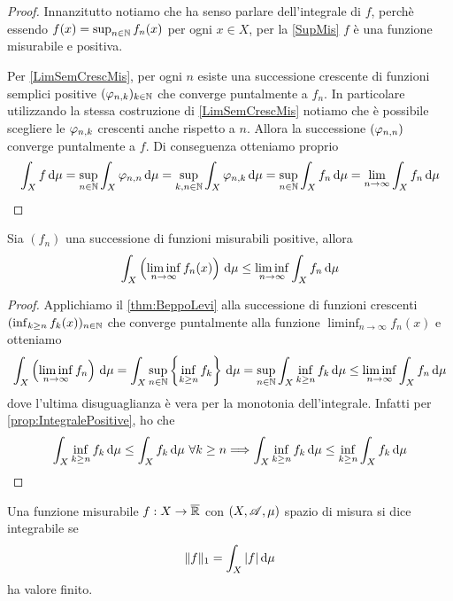 \begin{proof}
	Innanzitutto notiamo che ha senso parlare dell'integrale di $f$, perchè essendo $f(x)=\sup_{n\in\mathbb N}f_n(x)$ per ogni $x\in X$, per la \cref{SupMis} $f$ è una funzione misurabile e positiva.
	
	Per \cref{LimSemCrescMis}, per ogni $n$ esiste una successione crescente di funzioni semplici positive $(\varphi_{n,k})_{k\in\mathbb N}$ che converge puntalmente a $f_n$. In particolare utilizzando la stessa costruzione di \cref{LimSemCrescMis} notiamo che è possibile scegliere le $\varphi_{n,k}$ crescenti anche rispetto a $n$. Allora la successione $(\varphi_{n,n})$ converge puntalmente a $f$. Di conseguenza otteniamo proprio
	\begin{equation*}
		\int_X f\,\mathrm d\mu=\sup_{n\in\mathbb N}\int_X\varphi_{n,n}\,\mathrm d\mu=\sup_{k,n\in\mathbb N}\int_X \varphi_{n,k}\,\mathrm d\mu=\sup_{n\in\mathbb N}\int_X f_n\,\mathrm d\mu=\lim_{n\to\infty}\int_Xf_n\,\mathrm d\mu
	\end{equation*}
\end{proof}


\begin{lemma}[Fatou] \label{lem:Fatou}
	Sia $(f_n)$ una successione di funzioni misurabili positive, allora 
	\begin{equation*}
		\int_X\left(\liminf_{n\to\infty}f_n(x)\right)\,\mathrm d\mu\le \liminf_{n\to\infty}\int_Xf_n\,\mathrm d\mu
	\end{equation*}
\end{lemma}

\begin{proof}
	Applichiamo il \cref{thm:BeppoLevi} alla successione di funzioni crescenti $(\inf_{k\ge n}f_k(x))_{n\in\mathbb N}$ che converge puntalmente alla funzione $\liminf_{n\to\infty}f_n(x)$ e otteniamo
	\begin{equation*}
		\int_X\left(\liminf_{n\to\infty}f_n\right)\,\mathrm d\mu=\int_X \sup_{n\in\mathbb N}\left\{\inf_{k\ge n}f_k\right\}\,\mathrm d\mu=\sup_{n\in\mathbb N}\int_X \inf_{k\ge n}f_k\,\mathrm d\mu\le \liminf_{n\to\infty}\int_Xf_n\,\mathrm d\mu
	\end{equation*}
	dove l'ultima disuguaglianza è vera per la monotonia dell'integrale. Infatti per \cref{prop:IntegralePositive}, ho che
	\begin{equation*}
		\int_X \inf_{k\ge n}f_k\,\mathrm d\mu\le \int_Xf_k\,\mathrm d\mu \ \forall k\ge n \Longrightarrow \int_X \inf_{k\ge n}f_k\,\mathrm d\mu\le \inf_{k\ge n}\int_Xf_k\,\mathrm d\mu
	\end{equation*}
\end{proof}

\begin{definition}
	Una funzione misurabile $f:X\to\overline{\mathbb R}$ con $(X,\mathscr A,\mu)$ spazio di misura si dice integrabile se 
	\begin{equation*}
		\Vert f\Vert_1=\int_X |f|\,\mathrm d\mu
	\end{equation*}
	ha valore finito.
	
\end{definition}

